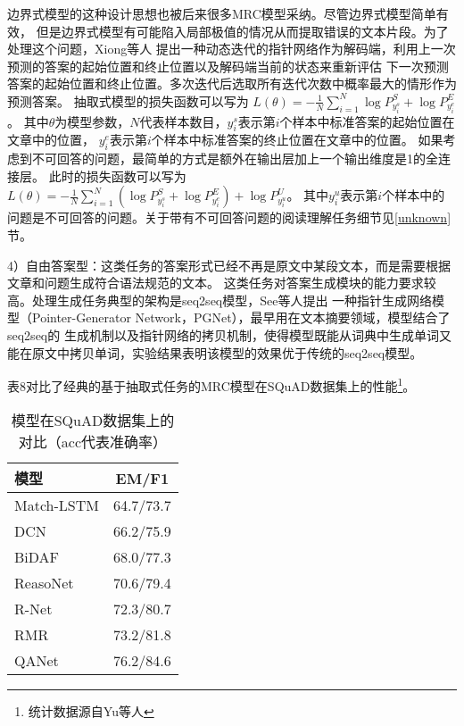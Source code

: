 边界式模型的这种设计思想也被后来很多MRC模型采纳。尽管边界式模型简单有效，
但是边界式模型有可能陷入局部极值的情况从而提取错误的文本片段。为了处理这个问题，Xiong等人
提出一种动态迭代的指针网络作为解码端，利用上一次预测的答案的起始位置和终止位置以及解码端当前的状态来重新评估
下一次预测答案的起始位置和终止位置。多次迭代后选取所有迭代次数中概率最大的情形作为预测答案。
抽取式模型的损失函数可以写为
$L(\theta)=-\displaystyle\frac{1}{N}\sum_{i=1}^{N}\log P_{y_i^s}^S+\log P_{y_i^e}^E$。
其中$\theta$为模型参数，$N$代表样本数目，$y_i^s$表示第$i$个样本中标准答案的起始位置在文章中的位置，
$y_i^e$表示第$i$个样本中标准答案的终止位置在文章中的位置。
如果考虑到不可回答的问题，最简单的方式是额外在输出层加上一个输出维度是1的全连接层。
此时的损失函数可以写为
$L(\theta)=-\displaystyle\frac{1}{N}\sum_{i=1}^{N}(\log P_{y_i^s}^S+\log P_{y_i^e}^E)+\log P_{y_i^u}^U$。
其中$y_i^u$表示第$i$个样本中的问题是不可回答的问题。关于带有不可回答问题的阅读理解任务细节见\ref{unknown}节。

4）自由答案型：这类任务的答案形式已经不再是原文中某段文本，而是需要根据文章和问题生成符合语法规范的文本。
这类任务对答案生成模块的能力要求较高。处理生成任务典型的架构是seq2seq模型，See等人提出
一种指针生成网络模型（Pointer-Generator Network，PGNet），最早用在文本摘要领域，模型结合了seq2seq的
生成机制以及指针网络的拷贝机制，使得模型既能从词典中生成单词又能在原文中拷贝单词，实验结果表明该模型的效果优于传统的seq2seq模型。

表8对比了经典的基于抽取式任务的MRC模型在SQuAD数据集上的性能\footnote{统计数据源自Yu等人}。


\begin{table}[ht]
	\centering
	\caption{模型在SQuAD数据集上的对比（acc代表准确率）}
	\begin{tabular}{l c}
		\toprule
		模型&EM/F1\\
		\midrule
		Match-LSTM\upcite{MatchLSTM}& 64.7/73.7\\
		\midrule
		DCN\upcite{DCN}& 66.2/75.9\\
		\midrule
		BiDAF\upcite{BiDAF}&68.0/77.3\\
		\midrule
		ReasoNet\upcite{Reasonet}&70.6/79.4\\
		\midrule
		R-Net\upcite{RNet}&72.3/80.7 \\
		\midrule
		RMR\upcite{RMR}&73.2/81.8 \\
		\midrule
		QANet\upcite{QANet}& 76.2/84.6\\
		\bottomrule
	\end{tabular}
\end{table}